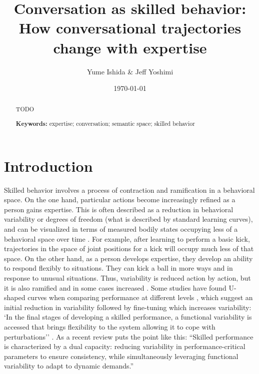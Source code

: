 \documentclass{article}
\begin{document}
\title{Conversation as skilled behavior: How conversational trajectories change with expertise}
\author{Yume Ishida \& Jeff Yoshimi}
\date{\today}
\maketitle

\begin{abstract}
TODO

\textbf{Keywords:} expertise; conversation; semantic space; skilled behavior
\end{abstract}

\section{Introduction}

Skilled behavior involves a process of contraction and ramification in a behavioral space. On the one hand, particular actions become increasingly refined as a person gains expertise. This is often described as a reduction in behavioral variability or degrees of freedom (what is described by standard learning curves), and can be visualized in terms of measured bodily states occupying less of a behavioral space over time \citep{vereijken1992freezing,adolph2015intraindividual}. For example, after learning to perform a basic kick, trajectories in the space of joint positions for a kick will occupy much less of that space. On the other hand, as a person develops expertise, they develop an ability to respond flexibly to situations. They can kick a ball in more ways and in response to unusual situations. Thus, variability is reduced action by action, but it is also ramified and in some cases increased \citep{wilson2008coordination,adolph2015intraindividual}. Some studies have found U-shaped curves when comparing performance at different levels \citep{wilson2008coordination,busquets2016differing}, which suggest an initial reduction in variability followed by fine-tuning which increases variability: `In the final stages of developing a skilled performance, a functional variability is accessed that brings flexibility to the system allowing it to cope with perturbations'' \cite{wilson2008coordination}. As a recent review puts the point like this: ``Skilled performance is characterized by a dual capacity: reducing variability in performance-critical parameters to ensure consistency, while simultaneously leveraging functional variability to adapt to dynamic demands.'' \citep{tsunoda2026relationship}
\end{document}
